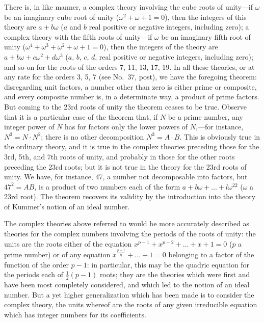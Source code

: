 \documentclass[11pt,a4paper]{book}
\begin{document}
There is, in like manner, a complex theory involving the cube roots of unity---if $\omega$ be an imaginary cube root of unity ($\omega^2+\omega+1=0$), then the integers of this theory are $a+b\omega$ ($a$ and $b$ real positive or negative integers, including zero); a complex theory with the fifth roots of unity---if $\omega$ be an imaginary fifth root of unity ($\omega^4+\omega^3+\omega^2+\omega+1=0$), then the integers of the theory are $a+b\omega+c\omega^2+d\omega^3$ ($a$, $b$, $c$, $d$, real positive or negative integers, including zero); and so on for the roots of the orders 7, 11, 13, 17, 19. In all these theories, or at any rate for the orders 3, 5, 7 (see No.~37, post), we have the foregoing theorem: disregarding unit factors, a number other than zero is either prime or composite, and every composite number is, in a determinate way, a product of prime factors. But coming to the 23rd roots of unity the theorem ceases to be true. Observe that it is a particular case of the theorem that, if $N$ be a prime number, any integer power of $N$ has for factors only the lower powers of $N$,---for instance, $N^3=N\cdot N^2$; there is no other decomposition $N^3=A\cdot B$. This is obviously true in the ordinary theory, and it is true in the complex theories preceding those for the 3rd, 5th, and 7th roots of unity, and probably in those for the other roots preceding the 23rd roots; but it is not true in the theory for the 23rd roots of unity. We have, for instance, 47, a number not decomposable into factors, but $47^2=AB$, is a product of two numbers each of the form $a+b\omega+\ldots+l\omega^{22}$ ($\omega$ a 23rd root). The theorem recovers its validity by the introduction into the theory of Kummer's notion of an ideal number.

The complex theories above referred to would be more accurately described as theories for the complex numbers involving the periods of the roots of unity: the units are the roots either of the equation $x^{p-1}+x^{p-2}+\ldots+x+1=0$ ($p$ a prime number) or of any equation $x^{\frac{p-1}{q}}+\ldots+1=0$ belonging to a factor of the function of the order $p-1$: in particular, this may be the quadric equation for the periods each of $\tfrac12(p-1)$ roots; they are the theories which were first and have been most completely considered, and which led to the notion of an ideal number. But a yet higher generalization which has been made is to consider the complex theory, the units whereof are the roots of any given irreducible equation which has integer numbers for its coefficients.
\end{document}

